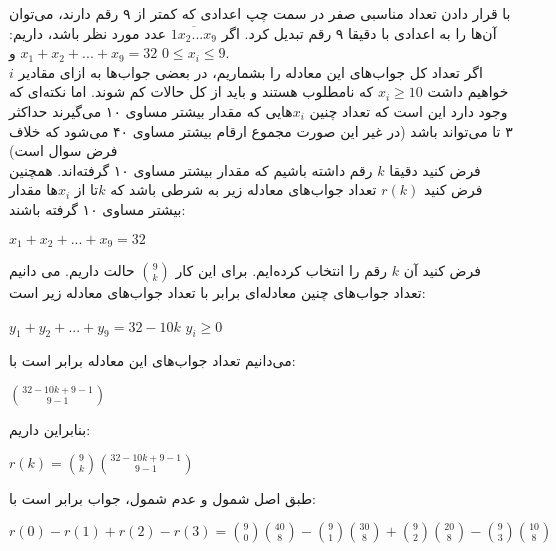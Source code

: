 	\p
با قرار دادن تعداد مناسبی صفر در سمت چپ اعدادی که کمتر از ۹ رقم دارند، می‌توان آن‌ها را به اعدادی با دقیقا ۹ رقم تبدیل کرد. اگر 
$\overline{1x_2...x_9}$
 عدد مورد نظر باشد، داریم: 
 $x_1 + x_2 + ... + x_9 = 32$
  و
  $0 \leq x_i \leq 9$. \\
			 اگر تعداد کل جواب‌های این معادله را بشماریم، در بعضی جواب‌ها به ازای مقادیر $i$ خواهیم داشت $x_i \geq 10$ که نامطلوب هستند و باید از کل حالات کم شوند. اما نکته‌ای که وجود دارد این است که تعداد چنین $x_i$هایی که مقدار بیشتر مساوی ۱۰ می‌گیرند 
			 حداکثر ۳ تا می‌تواند باشد (در غیر این صورت مجموع ارقام بیشتر مساوی ۴۰ می‌شود که خلاف فرض سوال است)\\ 
			 
			 فرض کنید دقیقا $k$ رقم داشته باشیم که مقدار بیشتر مساوی ۱۰ گرفته‌اند.
			 همچنین فرض کنید $r(k)$ تعداد جواب‌های معادله زیر به شرطی باشد که $k$تا از $x_i$ها مقدار بیشتر مساوی ۱۰ گرفته باشند:\\
			 \begin{center}
			     $x_1 + x_2 + ... + x_9 = 32$
			 \end{center}
			 
			 فرض کنید آن $k$ رقم را انتخاب کرده‌ایم.
			 برای این کار $\binom{9}{k}$
			 حالت داریم.
			 می دانیم تعداد جواب‌های چنین معادله‌ای برابر با تعداد جواب‌های معادله زیر است:\\
			 \begin{center}
			     $y_1 + y_2 + ... + y_9 = 32 - 10k$ 
			     $y_i \geq 0$
			 \end{center}
			 می‌دانیم تعداد جواب‌های این معادله برابر است با:\\
			 \begin{center}
			     $\binom{32 - 10k + 9 - 1}{9 - 1}$
			 \end{center}
			 بنابراین داریم:\\
			 \begin{center}
			     $r(k) = \binom{9}{k}\binom{32 - 10k + 9 - 1}{9 - 1}$
			 \end{center}
			 
		    طبق اصل شمول و عدم شمول، جواب برابر است با:\\
			\begin{center}
			
			$r(0) - r(1) + r(2) - r(3) = \binom{9}{0}\binom{40}{8} - \binom{9}{1}\binom{30}{8} + \binom{9}{2}\binom{20}{8} - \binom{9}{3}\binom{10}{8}$
			
			\end{center}